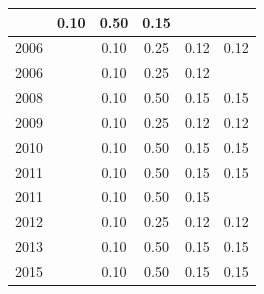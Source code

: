 \begin{table}[H]
\begin{tabular}{| l | c | c | c | c | c |}
          &
          0.10
          &
          0.50
          &
          0.15
          &
          \\
\hline
            2006
          &
          
          &
          0.10
          &
          0.25
          &
          0.12
          &
            {\color{red} 0.12}
          \\
            2006
          &
          
          &
          0.10
          &
          0.25
          &
          0.12
          &
          \\
\hline
            2008
          &
          
          &
          0.10
          &
          0.50
          &
          0.15
          &
            {\color{red} 0.15}
          \\
\hline
            2009
          &
          
          &
          0.10
          &
          0.25
          &
          0.12
          &
            {\color{red} 0.12}
          \\
\hline
            2010
          &
          
          &
          0.10
          &
          0.50
          &
          0.15
          &
            {\color{red} 0.15}
          \\
\hline
            2011
          &
          
          &
          0.10
          &
          0.50
          &
          0.15
          &
            {\color{red} 0.15}
          \\
            2011
          &
          
          &
          0.10
          &
          0.50
          &
          0.15
          &
          \\
\hline
            2012
          &
          
          &
          0.10
          &
          0.25
          &
          0.12
          &
            {\color{red} 0.12}
          \\
\hline
            2013
          &
          
          &
          0.10
          &
          0.50
          &
          0.15
          &
            {\color{red} 0.15}
          \\
\hline
            2015
          &
          
          &
          0.10
          &
          0.50
          &
          0.15
          &
            {\color{red} 0.15}
          \\
\hline
\end{tabular}
\end{table}

